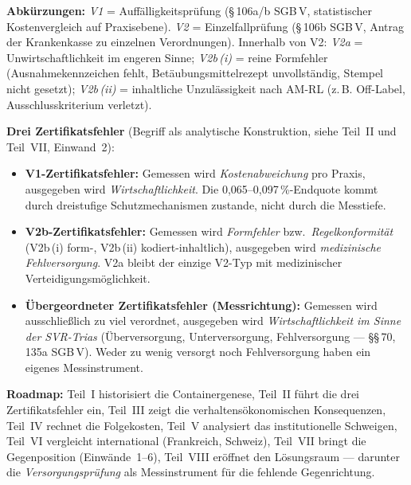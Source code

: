 \documentclass{umbruch-position}
\begin{document}
\begin{tcolorbox}[colback=gray!5,colframe=black!40,title={\textbf{Leseorientierung: Drei Zertifikatsfehler und V1/V2-Legende}}]
\textbf{Abk\"urzungen:} \emph{V1} = Auff\"alligkeitspr\"ufung (\S\,106a/b SGB\,V, statistischer Kostenvergleich auf Praxisebene). \emph{V2} = Einzelfallpr\"ufung (\S\,106b SGB\,V, Antrag der Krankenkasse zu einzelnen Verordnungen). Innerhalb von V2: \emph{V2a} = Unwirtschaftlichkeit im engeren Sinne; \emph{V2b\,(i)} = reine Formfehler (Ausnahmekennzeichen fehlt, Betäubungsmittelrezept unvollständig, Stempel nicht gesetzt); \emph{V2b\,(ii)} = inhaltliche Unzul\"assigkeit nach AM-RL (z.\,B. Off-Label, Ausschlusskriterium verletzt).

\smallskip
\noindent\textbf{Drei Zertifikatsfehler} (Begriff als analytische Konstruktion, siehe Teil~II und Teil~VII, Einwand~2):
\begin{itemize}[nosep,leftmargin=1.3em]
  \item \textbf{V1-Zertifikatsfehler:} Gemessen wird \emph{Kostenabweichung} pro Praxis, ausgegeben wird \emph{Wirtschaftlichkeit}. Die 0,065--0,097\,\%-Endquote kommt durch dreistufige Schutzmechanismen zustande, nicht durch die Messtiefe.
  \item \textbf{V2b-Zertifikatsfehler:} Gemessen wird \emph{Formfehler} bzw.\ \emph{Regelkonformit\"at} (V2b\,(i) form-, V2b\,(ii) kodiert-inhaltlich), ausgegeben wird \emph{medizinische Fehlversorgung}. V2a bleibt der einzige V2-Typ mit medizinischer Verteidigungsm\"oglichkeit.
  \item \textbf{\"Ubergeordneter Zertifikatsfehler (Messrichtung):} Gemessen wird ausschlie\ss{}lich \glqq{}zu viel verordnet\grqq{}, ausgegeben wird \emph{Wirtschaftlichkeit im Sinne der SVR-Trias} (\"Uberversorgung, Unterversorgung, Fehlversorgung --- \S\S\,70, 135a SGB\,V). Weder \glqq{}zu wenig versorgt\grqq{} noch Fehlversorgung haben ein eigenes Messinstrument.
\end{itemize}

\smallskip
\noindent\textbf{Roadmap:} Teil~I historisiert die Containergenese, Teil~II f\"uhrt die drei Zertifikatsfehler ein, Teil~III zeigt die verhaltens\"okonomischen Konsequenzen, Teil~IV rechnet die Folgekosten, Teil~V analysiert das institutionelle Schweigen, Teil~VI vergleicht international (Frankreich, Schweiz), Teil~VII bringt die Gegenposition (Einw\"ande~1--6), Teil~VIII er\"offnet den L\"osungsraum --- darunter die \emph{Versorgungspr\"ufung} als Messinstrument f\"ur die fehlende Gegenrichtung.
\end{tcolorbox}
\end{document}
